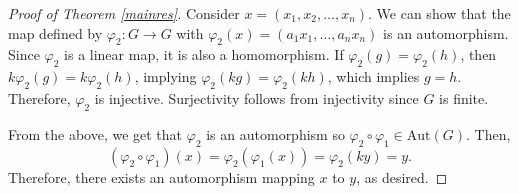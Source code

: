 \documentclass[11pt]{amsart}
\theoremstyle{definition}
\renewcommand{\phi}{\varphi}
\numberwithin{equation}{section}
\begin{document}
\begin{proof}[Proof of Theorem \ref{mainres}]
Consider $x = (x_1,x_2,\dots,x_n)$.
We can show that the map defined by $\phi_2 : G \rightarrow G$ with $\phi_2(x) = (a_1x_1, \dots, a_nx_n)$ is an automorphism. Since $\phi_2$ is a linear map, it is also a homomorphism. 
If $\phi_2(g) = \phi_2(h)$, then $k\phi_2(g) = k\phi_2(h)$, implying
$\phi_2(kg) = \phi_2(kh)$, which implies $g = h$. Therefore, $\phi_2$ is injective. Surjectivity follows from injectivity since $G$ is finite. 

From the above, we get that $\phi_2$ is an automorphism so $\phi_2 \circ \phi_1 \in \text{Aut}(G)$.
Then, 
$$(\phi_2 \circ \phi_1)(x) = \phi_2(\phi_1(x)) = \phi_2(ky) = y. $$
Therefore, there exists an automorphism mapping $x$ to $y$, as desired. 
\end{proof}
\end{document}
